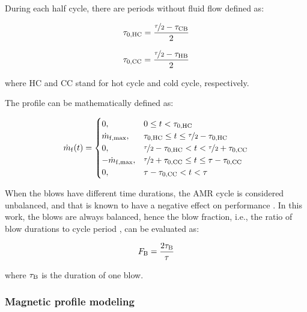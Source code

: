 \documentclass[referee]{svjour3}
\begin{document}
During each half cycle, there are periods without  fluid flow defined as:

\begin{equation}
\label{eq:48}
\tau_{\mathrm{0,HC}} = \frac{\nicefrac{\tau}{2} - \tau_{\mathrm{CB}}}{2}
\end{equation}

\begin{equation}
\label{eq:49}
\tau_{\mathrm{0,CC}} = \frac{\nicefrac{\tau}{2} - \tau_{\mathrm{HB}}}{2}
\end{equation}

where HC and CC stand for hot cycle and cold cycle, respectively.


The profile can be mathematically defined as:

\begin{equation}
\dot{m}_{\mathrm{f}}(t)=
\begin{cases}
0, & 0 \le t < \tau_{\mathrm{0,HC}} \\
\dot{m}_{\mathrm{f,max}}, & \tau_{\mathrm{0,HC}} \le t \le \nicefrac{\tau}{2} - \tau_{\mathrm{0,HC}} \\
0, & \nicefrac{\tau}{2} - \tau_{\mathrm{0,HC}} < t < \nicefrac{\tau}{2} + \tau_{\mathrm{0,CC}} \\
-\dot{m}_{\mathrm{f,max}}, & \nicefrac{\tau}{2} + \tau_{\mathrm{0,CC}} \le t \le \tau - \tau_{\mathrm{0,CC}} \\
0, &  \tau - \tau_{\mathrm{0,CC}} <  t < \tau \\
\end{cases}
\label{eq:50}
\end{equation}

When the blows have different time durations, the AMR cycle is considered unbalanced, and that is known to have a negative effect on performance \cite{bib:eriksen16_effec,bib:nakashima18-influen-exp}. In this work, the blows are always balanced, hence the blow fraction, i.e., the ratio of blow durations to cycle period \cite{bib:nakashima18-influen-exp}, can be evaluated as:

\begin{equation}
\label{eq:59}
F_{\mathrm{B}} = \frac{2\tau_{\mathrm{B}}}{\tau}
\end{equation}

\noindent where $\tau_{\mathrm{B}}$ is the duration of one blow.


\subsubsection{Magnetic profile modeling}
\label{sec:how-magnetic-profile}
\end{document}
